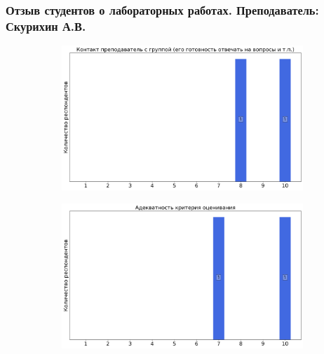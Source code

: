     \subsubsection{Отзыв студентов о лабораторных работах. Преподаватель: Скурихин А.В.}
        \begin{figure}[H]
            \centering
            \begin{subfigure}[b]{0.45\textwidth}
                \centering
                \includegraphics[width=\textwidth]{images/2 course/Радиотехнические цепи и сигналы/labniks-marks-Скурихин А.В.-0.png}
            \end{subfigure}
            \begin{subfigure}[b]{0.45\textwidth}
                \centering
                \includegraphics[width=\textwidth]{images/2 course/Радиотехнические цепи и сигналы/labniks-marks-Скурихин А.В.-1.png}
            \end{subfigure}
            \begin{subfigure}[b]{0.45\textwidth}
                \centering

\end{subfigure}
\end{figure}
